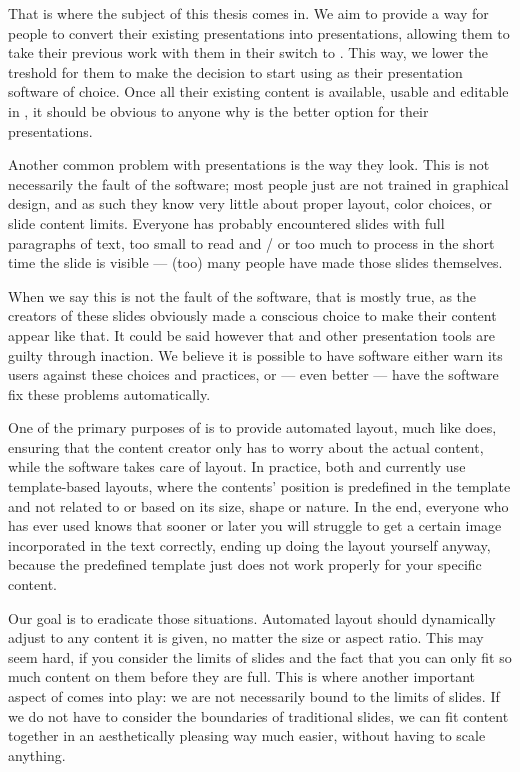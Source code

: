   That is where the subject of this thesis comes in. We aim to provide a way
  for people to convert their existing \ppt presentations into \mxp
  presentations, allowing them to take their previous work with them in their
  switch to \mxp. This way, we lower the treshold for them to make the decision
  to start using \mxp as their presentation software of choice. Once all their
  existing \ppt content is available, usable and editable in \mxp, it should be
  obvious to anyone why \mxp is the better option for their presentations.

  Another common problem with \ppt presentations is the way they look. This is
  not necessarily the fault of the software; most people just are not trained
  in graphical design, and as such they know very little about proper layout,
  color choices, or slide content limits. Everyone has probably encountered
  slides with full paragraphs of text, too small to read and / or too much to
  process in the short time the slide is visible --- (too) many people have
  made those slides themselves.

  When we say this is not the fault of the software, that is mostly true, as
  the creators of these slides obviously made a conscious choice to make their
  content appear like that. It could be said however that \ppt* and other
  presentation tools are guilty through inaction. We believe it is possible to
  have software either warn its users against these choices and practices, or
  --- even better --- have the software fix these problems automatically.

  One of the primary purposes of \mxp is to provide automated layout, much like
  \latex does, ensuring that the content creator only has to worry about the
  actual content, while the software takes care of layout. In practice, both
  \latex and \mxp currently use template-based layouts, where the contents'
  position is predefined in the template and not related to or based on its
  size, shape or nature. In the end, everyone who has ever used \latex knows
  that sooner or later you will struggle to get a certain image incorporated in
  the text correctly, ending up doing the layout yourself anyway, because the
  predefined template just does not work properly for your specific content.

  Our goal is to eradicate those situations. Automated layout should
  dynamically adjust to any content it is given, no matter the size or aspect
  ratio. This may seem hard, if you consider the limits of slides and the fact
  that you can only fit so much content on them before they are full. This is
  where another important aspect of \mxp comes into play: we are not
  necessarily bound to the limits of slides. If we do not have to consider the
  boundaries of traditional slides, we can fit content together in an
  aesthetically pleasing way much easier, without having to scale anything.

